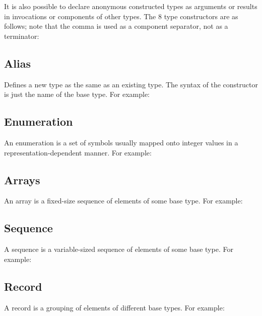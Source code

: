It is also possible to declare anonymous constructed types as
arguments or results in invocations or components of other types. The 8 type
constructors are as follows; note that the comma is used as a
component separator, not as a terminator:

\subsection{Alias}

Defines a new type as the same as an existing type. The syntax of the
constructor is just the name of the base type. For example:

\subsection{Enumeration}

An enumeration is a set of symbols usually mapped onto integer values
in a representation-dependent manner. For example:

\subsection{Arrays}

An array is a fixed-size sequence of elements of some base type. For
example:

\subsection{Sequence}

A sequence is a variable-sized sequence of elements of some base type.
For example:

\subsection{Record}

A record is a grouping of elements of different base types. For
example: 


